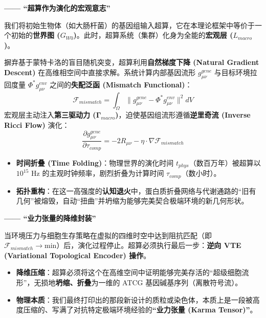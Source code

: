\textbf{—— “超算作为演化的宏观意志”}

我们将初始生物体（如大肠杆菌）的基因组输入超算，它在本理论框架中等价于一个初始的\textbf{世界图 ($G_{W0}$)}。此时，超算系统（集群）化身为全能的\textbf{宏观层 ($L_{macro}$)}。

\begin{theorem}[基因流形逆向演化定理]
    摒弃基于蒙特卡洛的盲目随机突变，超算利用\textbf{自然梯度下降 (Natural Gradient Descent)} 在高维相空间中直接求解。系统计算内部基因流形 $g_{\mu\nu}^{gene}$ 与目标环境拉回度量 $\Phi^* g_{\mu\nu}^{env}$ 之间的\textbf{失配泛函 (Mismatch Functional)}：
    $$ \mathcal{F}_{mismatch} = \int_{\Omega} \| g_{\mu\nu}^{gene} - \Phi^* g_{\mu\nu}^{env} \|^2 dV $$
    宏观层主动注入\textbf{第三驱动力 ($\mathbf{\Gamma}_{macro}$)}，迫使基因组流形遵循\textbf{逆里奇流 (Inverse Ricci Flow)} 演化：
    $$ \frac{\partial g_{\mu\nu}^{gene}}{\partial \tau_{comp}} = -2 R_{\mu\nu} - \eta \cdot \nabla \mathcal{F}_{mismatch} $$
\end{theorem}

\begin{itemize}
    \item   \textbf{时间折叠 (Time Folding)}：物理世界的演化时间 $t_{phys}$（数百万年）被超算以 $10^{15} \text{ Hz}$ 的主观时钟频率，剧烈折叠为计算时间 $\tau_{comp}$（数小时）。
    \item   \textbf{拓扑重构}：在这一高强度的\textbf{认知退火}中，蛋白质折叠网络与代谢通路的“旧有几何”被熔毁，自动“扭曲”并坍缩为能够完美契合极端环境的新几何形状。
\end{itemize}


\textbf{—— “业力张量的降维封装”}

当环境压力与细胞生存策略在虚拟的四维时空中达到阻抗匹配（即 $\mathcal{F}_{mismatch} \to \text{min}$）后，演化过程停止。超算必须执行最后一步：\textbf{逆向 VTE (Variational Topological Encoder) 操作}。

\begin{itemize}
    \item   \textbf{降维压缩}：超算必须将这个在高维空间中证明能够完美存活的“超级细胞流形”，无损地\textbf{坍缩、折叠}为一维的 ATCG 基因碱基序列（离散符号流）。
    \item   \textbf{物理本质}：我们最终打印出的那段新设计的质粒或染色体，本质上是一段被高度压缩的、写满了对抗特定极端环境经验的\textbf{“业力张量 (Karma Tensor)”}。
\end{itemize}

